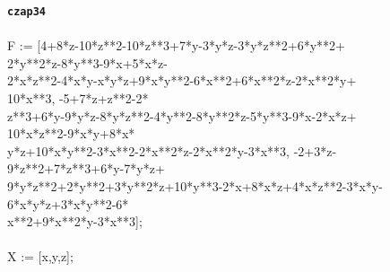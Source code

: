 \documentclass[letterpaper,12pt,titlepage,oneside,final]{book}
\newenvironment{codefont}{\footnotesize\ttfamily}{\par}
\begin{document}
\begin{appendices}
\noindent\textbf{\texttt{czap34}}\\\\
\noindent\begin{codefont}
 F := [4+8*z-10*z**2-10*z**3+7*y-3*y*z-3*y*z**2+6*y**2+\\2*y**2*z-8*y**3-9*x+5*x*z-\\
2*x*z**2-4*x*y-x*y*z+9*x*y**2-6*x**2+6*x**2*z-2*x**2*y+\\10*x**3, -5+7*z+z**2-2*\\
z**3+6*y-9*y*z-8*y*z**2-4*y**2-8*y**2*z-5*y**3-9*x-2*x*z+\\10*x*z**2-9*x*y+8*x*\\
y*z+10*x*y**2-3*x**2-2*x**2*z-2*x**2*y-3*x**3, -2+3*z-\\9*z**2+7*z**3+6*y-7*y*z+\\
9*y*z**2+2*y**2+3*y**2*z+10*y**3-2*x+8*x*z+4*x*z**2-3*x*y-\\6*x*y*z+3*x*y**2-6*\\
x**2+9*x**2*y-3*x**3];\\
\\
X := [x,y,z];\\
\end{codefont}


\end{appendices}
\end{document}
